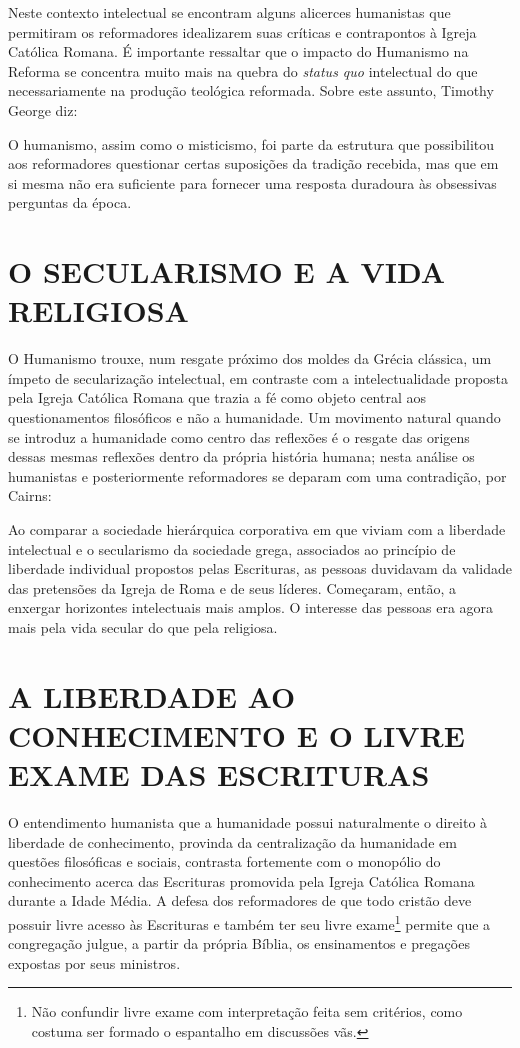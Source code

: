 \documentclass[
    article,            %
	12pt,				%
	oneside,			%
	a4paper,			%
	chapter=TITLE,		%
	section=TITLE,		%
	english,			%
	french,				%
	spanish,			%
	brazil				%
	]{abntex2}
\begin{document}
Neste contexto intelectual se encontram alguns alicerces humanistas que permitiram os reformadores idealizarem suas críticas e contrapontos à Igreja Católica Romana. É importante ressaltar que o impacto do Humanismo na Reforma se concentra muito mais na quebra do \emph{status quo} intelectual do que necessariamente na produção teológica reformada. Sobre este assunto, Timothy George diz:
\begin{citacao}
O humanismo, assim como o misticismo, foi parte da estrutura que possibilitou aos reformadores questionar certas suposições da tradição recebida, mas que em si mesma não era suficiente para fornecer uma resposta duradoura às obsessivas perguntas da época. \cite[p.49]{GEORGE}
\end{citacao}

\section{O SECULARISMO E A VIDA RELIGIOSA}
O Humanismo trouxe, num resgate próximo dos moldes da Grécia clássica, um ímpeto de secularização intelectual, em contraste com a intelectualidade proposta pela Igreja Católica Romana que trazia a fé como objeto central aos questionamentos filosóficos e não a humanidade. Um movimento natural quando se introduz a humanidade como centro das reflexões é o resgate das origens dessas mesmas reflexões dentro da própria história humana; nesta análise os humanistas e posteriormente reformadores se deparam com uma contradição, por Cairns:
\begin{citacao}
Ao comparar a sociedade hierárquica corporativa em que viviam com a liberdade intelectual e o secularismo da sociedade grega, associados ao princípio de liberdade individual propostos pelas Escrituras, as pessoas duvidavam da validade das pretensões da Igreja de Roma e de seus líderes. Começaram, então, a enxergar horizontes intelectuais mais amplos. O interesse das pessoas era agora mais pela vida secular do que pela religiosa. \cite[p. 254]{CAIRNS}
\end{citacao}


\section{A LIBERDADE AO CONHECIMENTO E O LIVRE EXAME DAS ESCRITURAS}
O entendimento humanista que a humanidade possui naturalmente o direito à liberdade de conhecimento, provinda da centralização da humanidade em questões filosóficas e sociais, contrasta fortemente com o monopólio do conhecimento acerca das Escrituras promovida pela Igreja Católica Romana durante a Idade Média.  A defesa dos reformadores de que todo cristão deve possuir livre acesso às Escrituras e também ter seu livre exame\footnote{Não confundir livre exame com interpretação feita sem critérios, como costuma ser formado o espantalho em discussões vãs.} permite que a congregação julgue, a partir da própria Bíblia, os ensinamentos e pregações expostas por seus ministros.
\end{document}
